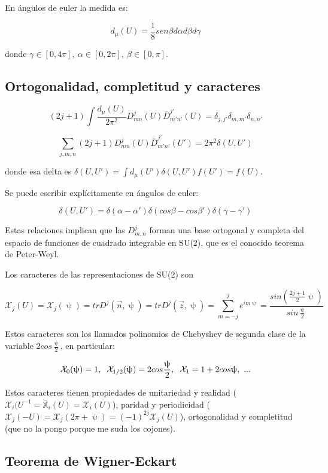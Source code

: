 \documentclass{article}
\begin{document}
\smallskip
En ángulos de euler la medida es:

$$d_\mu (U)=\frac{1}{8}sen \beta d\alpha d\beta d\gamma$$

donde $\gamma \in [0,4\pi], \ \alpha \in [0,2\pi], \ \beta \in [0,\pi]$.

\subsection{Ortogonalidad, completitud y caracteres}

$$(2j+1)\int \frac{d_\mu (U)}{2\pi^2} D^j_{mn}(U)\bar{D}_{m'n'}^{j'}(U)=\delta _{j,j'}\delta _{m,m'}\delta _{n,n'}$$

$$\sum _{j,m,n} (2j+1)D^j_{mn}(U)\bar{D}_{m'n'}^{j'}(U')=2\pi ^2 \delta (U,U')$$

donde esa delta es $\delta (U,U')=\int d_\mu (U')\delta (U,U') f(U') =f(U)$.

Se puede escribir explícitamente en ángulos de euler:

$$\delta (U,U')=\delta (\alpha - \alpha ')\delta (cos \beta - cos \beta ')\delta (\gamma - \gamma ')$$


Estas relaciones implican que las $D_{m,n}^j$ forman una base ortogonal y completa del espacio de funciones de cuadrado integrable en SU(2), que es el conocido teorema de Peter-Weyl.

\smallskip
Los caracteres de las representaciones de SU(2) son

$$\mathcal{X}_j(U)=\mathcal{X}_j(\uppsi)=trD^j(\Vec{n},\uppsi)=trD^j(\Vec{z},\uppsi)=\sum _{m=-j}^j e^{im\uppsi}=\frac{sin (\frac{2j+1}{2}\uppsi)}{sin \frac{\uppsi}{2}}$$

Estos caracteres son los llamados polinomios de Chebyshev de segunda clase de la variable $2cos\frac{\uppsi}{2}$, en particular:

$$\mathcal{X}_0(\uppsi)=1, \hspace{0.2cm} \mathcal{X}_{1/2}(\uppsi)=2cos \frac{\uppsi}{2}, \hspace{0.2cm} \mathcal{X}_1=1+2cos\uppsi , \ ...$$

Estos caracteres tienen propiedades de unitariedad y realidad ($\mathcal{X}_i(U^{-1}=\bar{\mathds{X}}_i(U)=\mathcal{X}_i(U)$), paridad y periodicidad ($\mathcal{X}_j(-U)=\mathcal{X}_j(2\pi + \uppsi) =(-1)^{2j}\mathcal{X}_j(U)$), ortogonalidad y completitud (que no la pongo porque me suda los cojones).

\subsection{Teorema de Wigner-Eckart}
\end{document}
